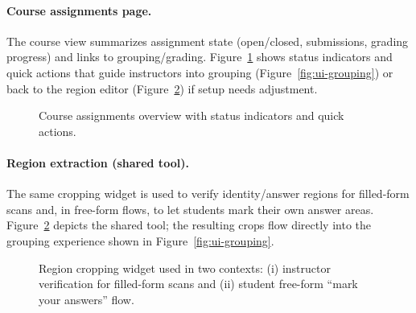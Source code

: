 \documentclass[ms,twoside,print]{nuthesis}
\begin{document}
\paragraph{Course assignments page.}
The course view summarizes assignment state (open/closed, submissions, grading progress) and links to grouping/grading. Figure~\ref{fig:course-page} shows status indicators and quick actions that guide instructors into grouping (Figure~\ref{fig:ui-grouping}) or back to the region editor (Figure~\ref{fig:ui-crops}) if setup needs adjustment.

\begin{figure}[htb]
  \centering
  \caption{Course assignments overview with status indicators and quick actions.}
  \label{fig:course-page}
\end{figure}

\paragraph{Region extraction (shared tool).}
The same cropping widget is used to verify identity/answer regions for filled-form scans and, in free-form flows, to let students mark their own answer areas. Figure~\ref{fig:ui-crops} depicts the shared tool; the resulting crops flow directly into the grouping experience shown in Figure~\ref{fig:ui-grouping}.

\begin{figure}[htb]
  \centering
  \caption{Region cropping widget used in two contexts: (i) instructor verification for filled-form scans and (ii) student free-form ``mark your answers'' flow.}
  \label{fig:ui-crops}
\end{figure}
\end{document}
